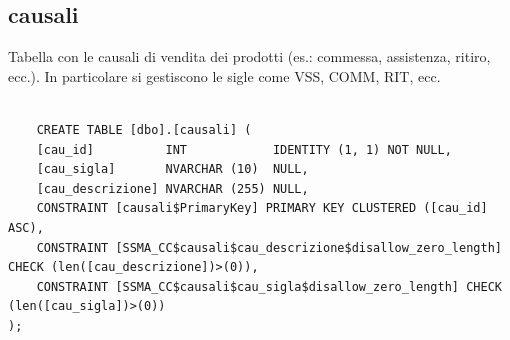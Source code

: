 \documentclass[12pt]{article}
\begin{document}
\subsection{causali}
Tabella con le causali di vendita dei prodotti (es.: commessa, assistenza, ritiro, ecc.).
In particolare si gestiscono le sigle come VSS, COMM, RIT, ecc.
\begin{lstlisting}

    CREATE TABLE [dbo].[causali] (
    [cau_id]          INT            IDENTITY (1, 1) NOT NULL,
    [cau_sigla]       NVARCHAR (10)  NULL,
    [cau_descrizione] NVARCHAR (255) NULL,
    CONSTRAINT [causali$PrimaryKey] PRIMARY KEY CLUSTERED ([cau_id] ASC),
    CONSTRAINT [SSMA_CC$causali$cau_descrizione$disallow_zero_length] CHECK (len([cau_descrizione])>(0)),
    CONSTRAINT [SSMA_CC$causali$cau_sigla$disallow_zero_length] CHECK (len([cau_sigla])>(0))
);

\end{lstlisting}
\end{document}
